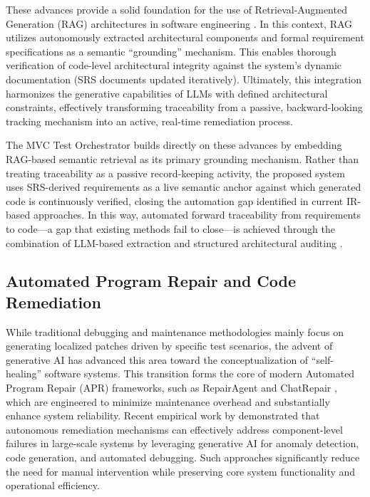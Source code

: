 These advances provide a solid foundation for the use of
Retrieval-Augmented Generation (RAG) architectures in software
engineering \citep{Hey2025}. In this context, RAG utilizes autonomously
extracted architectural components and formal requirement
specifications as a semantic ``grounding'' mechanism. This enables
thorough verification of code-level architectural integrity against the
system's dynamic documentation (SRS documents updated
iteratively). Ultimately, this integration harmonizes the generative
capabilities of LLMs with defined architectural constraints,
effectively transforming traceability from a passive, backward-looking
tracking mechanism into an active, real-time remediation process.

The MVC Test Orchestrator builds directly on these advances by
embedding RAG-based semantic retrieval as its primary grounding
mechanism. Rather than treating traceability as a passive
record-keeping activity, the proposed system uses SRS-derived
requirements as a live semantic anchor against which generated code is
continuously verified, closing the automation gap identified in current
IR-based approaches. In this way, automated forward traceability from requirements to code---a
gap that existing methods fail to close---is achieved through the combination
of LLM-based extraction and structured architectural auditing
\citep{dim2026mvc}.

\subsection{Automated Program Repair and Code Remediation}
\label{sec:related_apr}

While traditional debugging and maintenance methodologies mainly focus
on generating localized patches driven by specific test scenarios, the
advent of generative AI has advanced this area toward the
conceptualization of ``self-healing'' software systems. This
transition forms the core of modern Automated Program Repair (APR)
frameworks, such as RepairAgent \citep{Bouzenia2025} and ChatRepair
\citep{Xia2024}, which are engineered to minimize maintenance overhead
and substantially enhance system reliability. Recent empirical work by
\citet{Khlaisamniang2023} demonstrated that
autonomous remediation mechanisms can effectively address
component-level failures in large-scale systems by leveraging
generative AI for anomaly detection, code generation, and
automated debugging. Such approaches significantly reduce the
need for manual intervention while preserving core system
functionality and operational efficiency.

